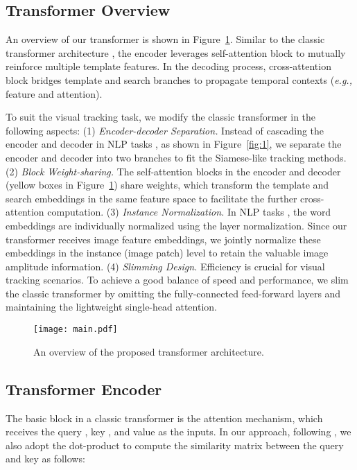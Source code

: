 \documentclass[10pt,twocolumn,letterpaper]{article}
\begin{document}
\subsection{Transformer Overview}\label{guidelines}


An overview of our transformer is shown in Figure~\ref{fig:main}. Similar to the classic transformer architecture \cite{Transformer}, the encoder leverages self-attention block to mutually reinforce multiple template features. 
In the decoding process, cross-attention block bridges template and search branches to propagate temporal contexts (\emph{e.g.,} feature and attention).


To suit the visual tracking task, we modify the classic transformer in the following aspects:
(1) \emph{Encoder-decoder Separation.} Instead of cascading the encoder and decoder in NLP tasks \cite{Transformer,BERT}, as shown in Figure~\ref{fig:1}, we separate the encoder and decoder into two branches to fit the Siamese-like tracking methods.
(2) \emph{Block Weight-sharing.} The self-attention blocks in the encoder and decoder (yellow boxes in Figure~\ref{fig:main}) share weights, which transform the template and search embeddings in the same feature space to facilitate the further cross-attention computation.
(3) \emph{Instance Normalization.} In NLP tasks \cite{Transformer}, the word embeddings are individually normalized using the layer normalization.
Since our transformer receives image feature embeddings, we jointly normalize these embeddings in the instance (image patch) level to retain the valuable image amplitude information.
(4) \emph{Slimming Design.} Efficiency is crucial for visual tracking scenarios. To achieve a good balance of speed and performance, we slim the classic transformer by omitting the fully-connected feed-forward layers and maintaining the lightweight single-head attention.


\begin{figure}
	\centering
	\texttt{[image: main.pdf]}
	\caption{An overview of the proposed transformer architecture.}\label{fig:main}
	\vspace{-0.1in}
\end{figure}



\subsection{Transformer Encoder}\label{encoder}

The basic block in a classic transformer is the attention mechanism, which receives the query , key , and value  as the inputs.
In our approach, following \cite{Transformer}, we also adopt the dot-product to compute the similarity matrix  between the query and key as follows: 
\end{document}
